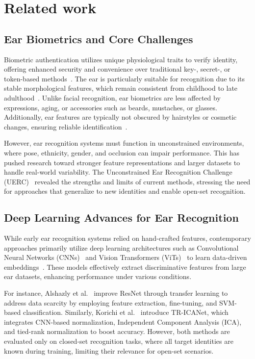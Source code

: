 \section{Related work}
\subsection{Ear Biometrics and Core Challenges} Biometric authentication utilizes unique physiological traits to verify identity, offering enhanced security and convenience over traditional key-, secret-, or token-based methods~\cite{Dargan_biometrics_survey}. The ear is particularly suitable for recognition due to its stable morphological features, which remain consistent from childhood to late adulthood~\cite{Ibrahim_effect_ears_age}. Unlike facial recognition, ear biometrics are less affected by expressions, aging, or accessories such as beards, mustaches, or glasses. Additionally, ear features are typically not obscured by hairstyles or cosmetic changes, ensuring reliable identification~\cite{Benzaoui_survey_earrec}.

However, ear recognition systems must function in unconstrained environments, where pose, ethnicity, gender, and occlusion can impair performance. This has pushed research toward stronger feature representations and larger datasets to handle real-world variability. The Unconstrained Ear Recognition Challenge (UERC)~\cite{uerc2023,uerc2019,uerc2017} revealed the strengths and limits of current methods, stressing the need for approaches that generalize to new identities and enable open-set recognition.

\subsection{Deep Learning Advances for Ear Recognition}
While early ear recognition systems relied on hand-crafted features, contemporary approaches primarily utilize deep learning architectures such as Convolutional Neural Networks (CNNs)~\cite{Emersic2019} and Vision Transformers (ViTs)~\cite{alexey_VIT} to learn data-driven embeddings~\cite{Ziga_ear_recog_review}. These models effectively extract discriminative features from large ear datasets, enhancing performance under various conditions.

For instance, Alshazly et al.~\cite{Alshazly_Ear_Resnet} improve ResNet through transfer learning to address data scarcity by employing feature extraction, fine-tuning, and SVM-based classification. Similarly, Korichi et al.~\cite{Korichi_TRICA} introduce TR-ICANet, which integrates CNN-based normalization, Independent Component Analysis (ICA), and tied-rank normalization to boost accuracy. However, both methods are evaluated only on closed-set recognition tasks, where all target identities are known during training, limiting their relevance for open-set scenarios.

